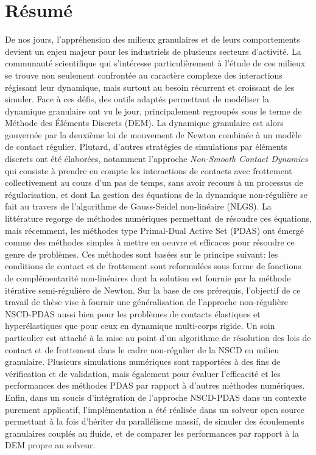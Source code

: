 {}
{}
\chapter*{Résumé}


De nos jours, l'appréhension des milieux granulaires et de leurs comportements devient un enjeu majeur pour les industriels de plusieurs secteurs d'activité. La communauté scientifique qui s'intéresse particulièrement à l'étude de ces milieux se trouve non seulement confrontée au caractère complexe des interactions régissant leur dynamique, mais surtout au besoin récurrent et croissant de les simuler. Face à ces défis, des outils adaptés permettant de modéliser la dynamique granulaire ont vu le jour, principalement regroupés sous le terme de Méthode des Éléments Discrets (DEM). La dynamique granulaire est alors gouvernée par la deuxième loi de mouvement  de Newton combinée à un  modèle  de contact régulier. Plutard, d'autres stratégies de simulations par éléments discrets ont été élaborées, notamment l'approche \textit{Non-Smooth Contact Dynamics} qui consiste à prendre en compte les interactions de contacts avec frottement collectivement au cours d'un pas de temps, sans avoir recours à un processus de régularisation, et dont La gestion des équations de la dynamique non-régulière se fait au travers de l'algorithme de Gauss-Seidel non-linéaire (NLGS). La littérature regorge de méthodes numériques permettant de résoudre ces équations, mais récemment, les méthodes type Primal-Dual Active Set (PDAS) ont émergé comme des méthodes simples à mettre en oeuvre et efficaces pour résoudre ce genre de problèmes. Ces méthodes sont basées sur le principe suivant: les conditions de contact et de frottement sont reformulées sous forme de fonctions de complémentarité non-linéaires dont la solution est fournie par la méthode itérative semi-régulière de Newton. Sur la base de ces prérequis, l'objectif de ce travail de thèse vise à fournir une généralisation de l'approche non-régulière NSCD-PDAS aussi bien pour les problèmes de contacts élastiques et hyperélastiques que pour ceux en dynamique multi-corps rigide. Un soin particulier est attaché à la mise au point d'un algorithme de résolution des lois de contact et de frottement dans le cadre non-régulier de la NSCD en milieu granulaire. Plusieurs simulations numériques sont rapportées à des fins de vérification et de validation, mais également pour évaluer l'efficacité et les performances des méthodes PDAS par rapport à d'autres méthodes numériques. Enfin, dans un soucis d'intégration de l'approche NSCD-PDAS dans un contexte purement applicatif, l'implémentation a été réalisée dans un solveur open source permettant à la fois d'hériter du parallélisme massif, de simuler des écoulements granulaires couplés au fluide, et de comparer les performances par rapport à la DEM propre au solveur.  


